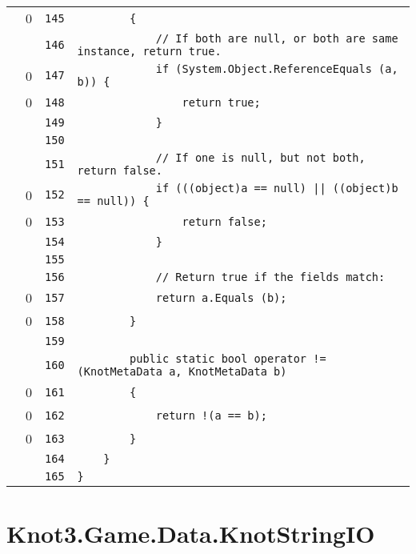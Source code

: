 \documentclass[a4paper,10pt]{article}
\begin{document}
\begin{longtable}[l]{lrrl}
\cellcolor{red} & 0 & \verb~145~ & \verb~        {~\\
\cellcolor{gray} &  & \verb~146~ & \verb~            // If both are null, or both are same instance, return true.~\\
\cellcolor{red} & 0 & \verb~147~ & \verb~            if (System.Object.ReferenceEquals (a, b)) {~\\
\cellcolor{red} & 0 & \verb~148~ & \verb~                return true;~\\
\cellcolor{gray} &  & \verb~149~ & \verb~            }~\\
\cellcolor{gray} &  & \verb~150~ & \verb~~\\
\cellcolor{gray} &  & \verb~151~ & \verb~            // If one is null, but not both, return false.~\\
\cellcolor{red} & 0 & \verb~152~ & \verb~            if (((object)a == null) || ((object)b == null)) {~\\
\cellcolor{red} & 0 & \verb~153~ & \verb~                return false;~\\
\cellcolor{gray} &  & \verb~154~ & \verb~            }~\\
\cellcolor{gray} &  & \verb~155~ & \verb~~\\
\cellcolor{gray} &  & \verb~156~ & \verb~            // Return true if the fields match:~\\
\cellcolor{red} & 0 & \verb~157~ & \verb~            return a.Equals (b);~\\
\cellcolor{red} & 0 & \verb~158~ & \verb~        }~\\
\cellcolor{gray} &  & \verb~159~ & \verb~~\\
\cellcolor{gray} &  & \verb~160~ & \verb~        public static bool operator != (KnotMetaData a, KnotMetaData b)~\\
\cellcolor{red} & 0 & \verb~161~ & \verb~        {~\\
\cellcolor{red} & 0 & \verb~162~ & \verb~            return !(a == b);~\\
\cellcolor{red} & 0 & \verb~163~ & \verb~        }~\\
\cellcolor{gray} &  & \verb~164~ & \verb~    }~\\
\cellcolor{gray} &  & \verb~165~ & \verb~}~\\
\end{longtable}
\newpage
\section{Knot3.Game.Data.KnotStringIO}
\end{document}

